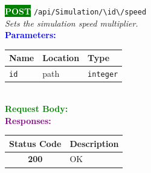 \begin{tcolorbox}[
    colback=green!5,
    colframe=green,
    arc=2mm,
    boxrule=1pt,
    left=5pt,
    right=5pt,
    top=5pt,
    bottom=5pt
]
\noindent\colorbox{green}{\textcolor{white}{\textbf{POST}}} 
\texttt{\large /api/Simulation/\textbackslash{}{id\textbackslash{}}/speed}\\[0.3em]
\textit{Sets the simulation speed multiplier.}\\[0.3em]
\vspace{0.3em}
\textbf{\textcolor{blue}{Parameters:}}\\[0.2em]
\begin{tabular}{|l|l|l|}
\hline
\rowcolor{gray!20}
\textbf{Name} & \textbf{Location} & \textbf{Type} \\ \hline
\texttt{id} & path & \texttt{integer} \\ \hline
\end{tabular}\\[0.5em]
\vspace{0.3em}
\textbf{\textcolor{green}{Request Body:}}\\[0.2em]
\vspace{0.3em}
\textbf{\textcolor{purple}{Responses:}}\\[0.2em]
\begin{tabular}{|c|p{10cm}|}
\hline
\rowcolor{gray!20}
\textbf{Status Code} & \textbf{Description} \\ \hline
\colorbox{green!20}{\textbf{200}} & OK \\ \hline
\end{tabular}
\end{tcolorbox}
\vspace{0.5em}

